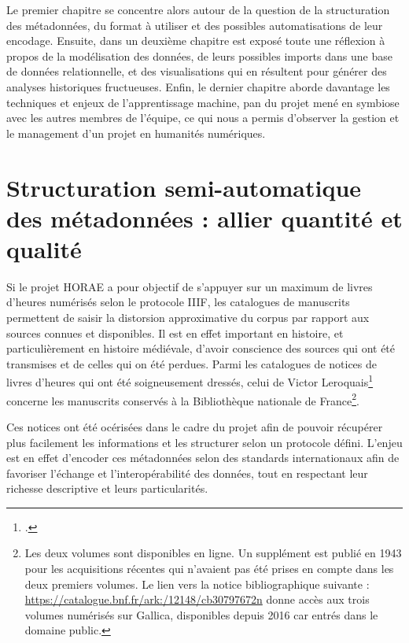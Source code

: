 \documentclass[a4paper,12pt,twoside]{book}
\begin{document}
Le premier chapitre se concentre alors autour de la question de la structuration des métadonnées, du format à utiliser et des possibles automatisations de leur encodage. Ensuite, dans un deuxième chapitre est exposé toute une réflexion à propos de la modélisation des données, de leurs possibles imports dans une base de données relationnelle, et des visualisations qui en résultent pour générer des analyses historiques fructueuses. Enfin, le dernier chapitre aborde davantage les techniques et enjeux de l'apprentissage machine, pan du projet mené en symbiose avec les autres membres de l'équipe, ce qui nous a permis d'observer la gestion et le management d'un projet en humanités numériques. 

	
	\thispagestyle{empty}
	\cleardoublepage
	
	\mainmatter
	
	\chapter{\label{metadonnees}Structuration semi-automatique des métadonnées : allier quantité et qualité}
		
	Si le projet HORAE a pour objectif de s'appuyer sur un maximum de livres d'heures numérisés selon le protocole IIIF, les catalogues de manuscrits permettent de saisir la distorsion approximative du corpus par rapport aux sources connues et disponibles. Il est en effet important en histoire, et particulièrement en histoire médiévale, d'avoir conscience des sources qui ont été transmises et de celles qui on été perdues. Parmi les catalogues de notices de livres d'heures qui ont été soigneusement dressés, celui de Victor Leroquais\footcite{Leroquais_notices} concerne les manuscrits conservés à la Bibliothèque nationale de France\footnote{ Les deux volumes sont disponibles en ligne. Un supplément est publié en 1943 pour les acquisitions récentes qui n'avaient pas été prises en compte dans les deux premiers volumes. Le lien vers la notice bibliographique suivante : \url{https://catalogue.bnf.fr/ark:/12148/cb30797672n} donne accès aux trois volumes numérisés sur Gallica, disponibles depuis 2016 car entrés dans le domaine public.}. 
	
	Ces notices ont été océrisées dans le cadre du projet afin de pouvoir récupérer plus facilement les informations et les structurer selon un protocole défini. L'enjeu est en effet d'encoder ces métadonnées selon des standards internationaux afin de favoriser l'échange et l'interopérabilité des données, tout en respectant leur richesse descriptive et leurs particularités. 
	
\end{document}
